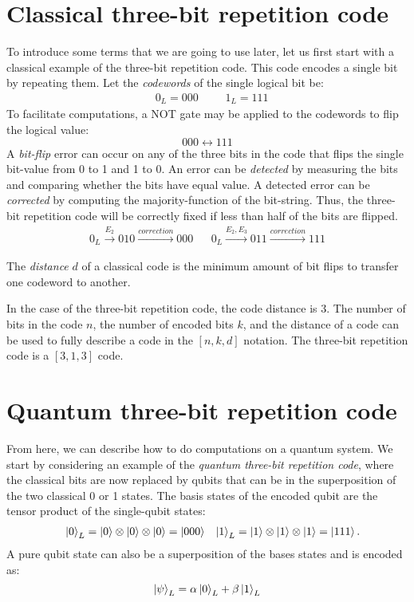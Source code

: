 \section{Classical three-bit repetition code}\label{sec:classical3bit}
To introduce some terms that we are going to use later, let us first start with a classical example of the three-bit repetition code. This code encodes a single bit by repeating them. Let the \emph{codewords} of the single logical bit be:
\begin{align}\label{eq:qb_3bitlogical}
    && 0_L = 000 &&& 1_L=111 &
\end{align}
To facilitate computations, a NOT gate may be applied to the codewords to flip the logical value:
\begin{equation}
 000 \leftrightarrow 111
\end{equation}
A \emph{bit-flip} error can occur on any of the three bits in the code that flips the single bit-value from 0 to 1 and 1 to 0. An error can be \emph{detected} by measuring the bits and comparing whether the bits have equal value. A detected error can be \emph{corrected} by computing the majority-function of the bit-string. Thus, the three-bit repetition code will be correctly fixed if less than half of the bits are flipped.
\begin{align}
  0_L \xrightarrow{E_2} 010 \xrightarrow{correction} 000 && 0_L \xrightarrow{E_2, E_3} 011 \xrightarrow{correction} 111
\end{align}
\begin{definition}\label{def:distance}
  The \emph{distance} $d$ of a classical code is the minimum amount of bit flips to transfer one codeword to another. 
\end{definition}
In the case of the three-bit repetition code, the code distance is 3. The number of bits in the code $n$, the number of encoded bits $k$, and the distance of a code can be used to fully describe a code in the $[n, k, d]$ notation. The three-bit repetition code is a $[3,1,3]$ code.

\section{Quantum three-bit repetition code}\label{sec:quantum3bit}

From here, we can describe how to do computations on a quantum system. We start by considering an example of the \emph{quantum three-bit repetition code}, where the classical bits are now replaced by qubits that can be in the superposition of the two classical 0 or 1 states. The basis states of the encoded qubit are the tensor product of the single-qubit states:
\begin{align}\label{eq:qb_3bitlogicalq}
&& \ket{0}_L = \ket{0}\otimes\ket{0}\otimes\ket{0} = \ket{000} && \ket{1}_L = \ket{1}\otimes\ket{1}\otimes\ket{1} = \ket{111}.
\end{align}
A pure qubit state can also be a superposition of the bases states and is encoded as:
\begin{equation}\label{eq:qec_3bitstate}
  \ket{\psi}_L = \alpha\ket{0}_L + \beta\ket{1}_L
\end{equation}

